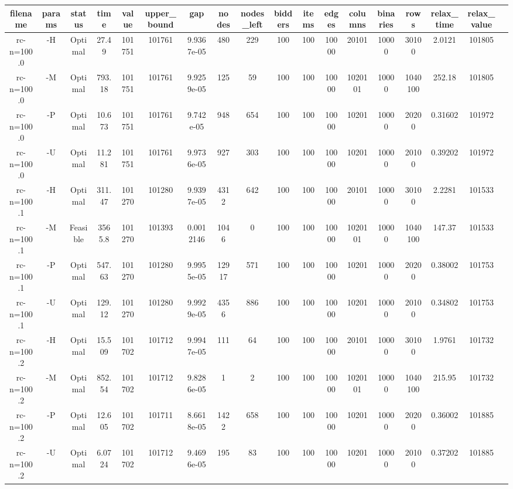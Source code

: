 \documentclass[landscape, a4paper]{article}
\begin{document}
\tiny

\begin{center}
\begin{tabular}{@{}cccccccccccccccccc@{}}
filename & params & status & time & value & upper\_bound & gap & nodes & nodes\_left & bidders & items & edges & columns & binaries & rows & relax\_time & relax\_value & \\
\hline
rc-n=100.0 & -H & Optimal & 27.49 & 101751 & 101761 & 9.9367e-05 & 480 & 229 & 100 & 100 & 10000 & 20101 & 10000 & 30100 & 2.0121 & 101805 & \\
rc-n=100.0 & -M & Optimal & 793.18 & 101751 & 101761 & 9.9259e-05 & 125 & 59 & 100 & 100 & 10000 & 1020101 & 10000 & 1040100 & 252.18 & 101805 & \\
rc-n=100.0 & -P & Optimal & 10.673 & 101751 & 101761 & 9.742e-05 & 948 & 654 & 100 & 100 & 10000 & 10201 & 10000 & 20200 & 0.31602 & 101972 & \\
rc-n=100.0 & -U & Optimal & 11.281 & 101751 & 101761 & 9.9736e-05 & 927 & 303 & 100 & 100 & 10000 & 10201 & 10000 & 20100 & 0.39202 & 101972 & \\
rc-n=100.1 & -H & Optimal & 311.47 & 101270 & 101280 & 9.9397e-05 & 4312 & 642 & 100 & 100 & 10000 & 20101 & 10000 & 30100 & 2.2281 & 101533 & \\
rc-n=100.1 & -M & Feasible & 3565.8 & 101270 & 101393 & 0.0012146 & 1046 & 0 & 100 & 100 & 10000 & 1020101 & 10000 & 1040100 & 147.37 & 101533 & \\
rc-n=100.1 & -P & Optimal & 547.63 & 101270 & 101280 & 9.9955e-05 & 12917 & 571 & 100 & 100 & 10000 & 10201 & 10000 & 20200 & 0.38002 & 101753 & \\
rc-n=100.1 & -U & Optimal & 129.12 & 101270 & 101280 & 9.9929e-05 & 4356 & 886 & 100 & 100 & 10000 & 10201 & 10000 & 20100 & 0.34802 & 101753 & \\
rc-n=100.2 & -H & Optimal & 15.509 & 101702 & 101712 & 9.9947e-05 & 111 & 64 & 100 & 100 & 10000 & 20101 & 10000 & 30100 & 1.9761 & 101732 & \\
rc-n=100.2 & -M & Optimal & 852.54 & 101702 & 101712 & 9.8286e-05 & 1 & 2 & 100 & 100 & 10000 & 1020101 & 10000 & 1040100 & 215.95 & 101732 & \\
rc-n=100.2 & -P & Optimal & 12.605 & 101702 & 101711 & 8.6618e-05 & 1422 & 658 & 100 & 100 & 10000 & 10201 & 10000 & 20200 & 0.36002 & 101885 & \\
rc-n=100.2 & -U & Optimal & 6.0724 & 101702 & 101712 & 9.4696e-05 & 195 & 83 & 100 & 100 & 10000 & 10201 & 10000 & 20100 & 0.37202 & 101885 & \\

\end{tabular}
\end{center}
\end{document}

